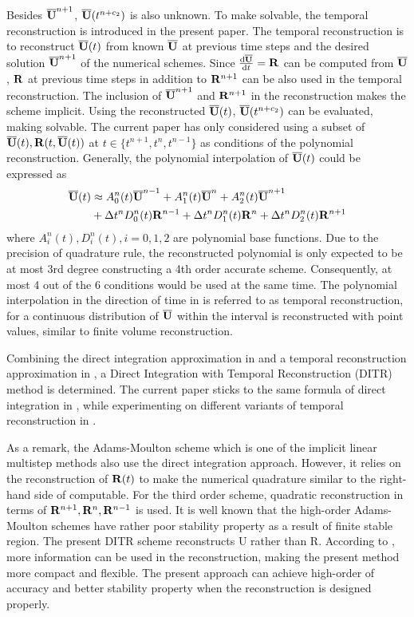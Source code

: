 Besides $\overline{\mathbf{U}}^{n+1}$, $\overline{\mathbf{U}}(t^{n+c_2})$ is also unknown.
To make 
solvable, the temporal reconstruction is introduced in the
present paper.
The temporal reconstruction is to reconstruct $\overline{\mathbf{U}}(t)$
from known $\overline{\mathbf{U}}$ at previous time steps and the desired
solution $\overline{\mathbf{U}}^{n+1}$ of the numerical schemes. Since $\frac{\dd\overline{\mathbf{U}}}{\dd t}=\mathbf{R}$
can be computed from  $\overline{\mathbf{U}}$, $\mathbf{R}$ at previous time steps in 
addition to $\mathbf{R}^{n+1}$ can be also used in the temporal reconstruction.
The inclusion of $\overline{\mathbf{U}}^{n+1}$ and $\mathbf{R}^{n+1}$ in the reconstruction
makes the scheme implicit.
Using the reconstructed $\overline{\mathbf{U}}(t)$, $\overline{\mathbf{U}}(t^{n+c_2})$
can be evaluated, making  solvable.
The current paper has only considered using a subset of
$\overline{\mathbf{U}}(t), \mathbf{R}(t, \overline{\mathbf{U}}(t))$ at $t \in \{t^{n+1}, t^n, t^{n-1}\}$
as conditions of the polynomial reconstruction.
Generally, the polynomial interpolation
of $\overline{\mathbf{U}}(t)$ could be expressed as
\begin{equation}
    \begin{aligned}
        \label{eq:TR}
        \overline{\mathbf{U}}(t) & \approx
        A^n_0(t)\overline{\mathbf{U}}^{n - 1} +
        A^n_1(t)\overline{\mathbf{U}}^{n} +
        A^n_2(t)\overline{\mathbf{U}}^{n + 1}
        \\ & +
        {\Delta} t^n D^n_0(t)\mathbf{R}^{n - 1} +
        {\Delta} t^n D^n_1(t)\mathbf{R}^{n} +
        {\Delta} t^n D^n_2(t)\mathbf{R}^{n + 1}
    \end{aligned}
\end{equation}
where $A^n_i(t), D^n_i(t), i=0,1,2$
are polynomial base functions. 
Due to the precision of quadrature rule,
the reconstructed polynomial is only expected to be at most 3rd degree 
constructing a 4th order accurate scheme.
Consequently, at most 4 out of the
6 conditions would be used at the same time.
The polynomial interpolation in the direction of time in 
is referred to as temporal reconstruction, for
a continuous distribution of $\overline{\mathbf{U}}$ within the interval
is reconstructed with point values,
similar to finite volume reconstruction.

Combining the direct integration approximation in 
and a temporal reconstruction approximation in ,
a Direct Integration with Temporal Reconstruction (DITR) method is
determined.
The current paper sticks to the same formula of direct integration
in , while experimenting on different
variants of temporal reconstruction in . 

As a remark, the Adams-Moulton scheme which is one of the
implicit linear multistep methods also use the direct
integration approach.
However, it relies on the
reconstruction of $\mathbf{R}(t)$ to make the numerical quadrature
similar to the right-hand side of  computable.
For the third order scheme, quadratic reconstruction in terms
of $\mathbf{R}^{n+1},\mathbf{R}^{n},\mathbf{R}^{n-1}$ is used.
It is well known that the high-order
Adams-Moulton schemes have rather poor stability
property as a result of finite stable region. 
The present DITR scheme reconstructs U rather
than R. According to ,
more information can be used
in the reconstruction, making the present method more
compact and flexible. The present approach can achieve
high-order of accuracy and better stability property when
the reconstruction is designed properly.

